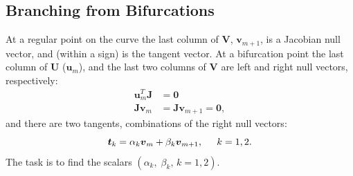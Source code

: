 \documentclass[10pt,openany,twoside]{book}
\numberwithin{equation}{section}   %
\newcommand{\Matrix}[1]{\boldsymbol{#1}}
\newcommand{\Vector}[1]{\boldsymbol{#1}}
\begin{document}
\subsection{Branching from Bifurcations}
At a regular point on the curve the last column of $\Matrix{V}$, $\Vector{v}_{m+1}$,
is a Jacobian null vector,
and (within a sign) is the tangent vector.
At a bifurcation point the last column of $\Matrix{U}$ ($\Vector{u}_m$),
and the last two columns of $\Matrix{V}$ are left and right null vectors, respectively:
\begin{align}
\Vector{u}_m^T\Matrix{J} &= \Vector{0} \nonumber \\
\Matrix{J}\Vector{v}_m &= \Matrix{J} \Vector{v}_{m+1} = \Vector{0},
\end{align}
and there are two tangents,
combinations of the right null vectors:
\begin{equation}
\label{eqn:tanb}
\Vector{t}_k = \alpha_k \Vector{v}_m + \beta_k \Vector{v}_{m+1}, \hspace{0.2in} k=1,2.
\end{equation}
The task is to find the scalars $(\alpha_k,\; \beta_k,\, k=1,2)$.
\end{document}
